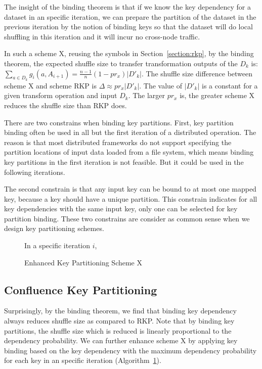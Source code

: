 \documentclass[10pt,journal,compsoc]{IEEEtran}
\makeatletter
\newcommand{\removelatexerror}{\let\@latex@error\@gobble}
\makeatother
\begin{document}
The insight of the binding theorem is that if we know the key dependency 
for a dataset in an specific iteration,  we can prepare the partition
of the dataset in the previous iteration by the notion of binding keys so that the dataset
will do local shuffling in this iteration and it will incur no cross-node traffic. 

In such a scheme X, reusing the symbols in Section~\ref{section:rkp}, 
by the binding theorem, the expected shuffle size to transfer 
transformation outputs of the $D_k$ is: $\sum_{a \in D_k} g_i(a, A_{i+1}) = \frac{n-1}{n} (1 - pr_x) |D'_{k}|$.
The shuffle size difference between scheme X and scheme RKP is 
$ \Delta \approx pr_x |D'_{k}|$. 
The value of $|D'_{k}|$ is a constant for a given transform operation and input $D_k$. 
The larger $pr_x$ is, the greater scheme X reduces the shuffle size than RKP does. 

There are two constrains when binding key partitions. 
First, key partition binding often be used in all but the first iteration of a distributed operation.
The reason is that most distributed frameworks do not support specifying the partition locations of input data loaded from a file system, which means 
binding key partitions in the first iteration is not feasible. 
But it could be used in the following iterations.

The second constrain is that any input key can be bound to at most one mapped 
key, because a key should have a unique partition. 
This constrain indicates for all key dependencies with the same input key, only one can be selected for key partition binding. 
These two constrains are consider as common sense when we design key partitioning schemes.

\begin{figure}[!t]
\removelatexerror

\begin{algorithm}[H]
  In a specific iteration $i$,

\caption{Enhanced Key Partitioning Scheme X}
\label{algo:x}
\end{algorithm}
\end{figure}


\subsection{Confluence Key Partitioning}\label{section:ckp}
Surprisingly, by the binding theorem, we find that
binding key dependency always reduces shuffle size as compared to RKP. 
Note that by binding key partitions, the shuffle size which is reduced is 
linearly proportional to the dependency probability. 
We can further enhance scheme X 
by applying key binding based on the key dependency with the 
maximum dependency probability for each key in an specific iteration (Algorithm~\ref{algo:x}). 
\end{document}
